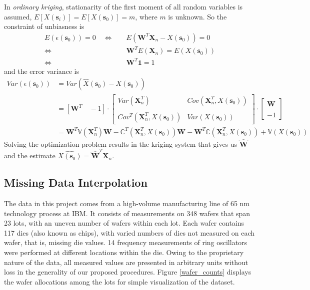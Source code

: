 \documentclass[12pt]{article}
\numberwithin{equation}{section}
\numberwithin{table}{section}
\numberwithin{figure}{section}
\newcommand{\bms}{\bm{s}}
\begin{document}
In \emph{ordinary kriging}, stationarity of the first moment of
all random variables is assumed, $ E[X(\bms_i)] = E[X(\bms_0)] = m$,
where $m$ is unknown. So the constraint of unbiasness is 
\begin{equation} \label{unbias}
\begin{split}
  E(\epsilon(\bms_0)) = 0 \quad 
  \Leftrightarrow \quad &E(\bm{W}^T\bm{X}_n - X(\bms_0)) = 0 \\
  \Leftrightarrow \quad &\bm{W}^TE(\bm{X}_n) = E(X(\bms_0)) \\
  \Leftrightarrow \quad &\bm{W}^T\bm{1} = 1
\end{split}
\end{equation}
and the error variance is
\begin{equation} \label{varerr}
\begin{split}
  Var(\epsilon(\bms_0)) &= Var(\hat{X}(\bms_0) - X(\bms_0)) \\
  &=[\bm{W}^T \quad -1] \cdot 
  \begin{bmatrix}
    Var(\bm{X}_n^T) &  Cov(\bm{X}_n^T,  X(\bms_0))\\
    \\
    Cov^T(\bm{X}_n^T,  X(\bms_0)) & Var(X(\bms_0))
  \end{bmatrix}
  \cdot \begin{bmatrix}
    \bm{W} \\
    \\
    -1
  \end{bmatrix} \\
 &=\bm{W}^T\mathbb{V}(\bm{X}_n^T)\bm{W} - \mathbb{C}^T(\bm{X}_n^T, X(\bms_0))\bm{W}
  - \bm{W}^T\mathbb{C}(\bm{X}_n^T, X(\bms_0)) + \mathbb{V}(X(\bms_0))
\end{split}
\end{equation}
Solving the optimization problem results in the kriging system that
gives us $\hat{\bm{W}}$ and the estimate $\hat{X(\bms_0)}=\hat{\bm{W}}^T\bm{X}_n$.


\subsection{Missing Data Interpolation} \label{nafit}

\hspace{12 pt}
The data in this project comes from a high-volume manufacturing line
of 65 nm technology process at IBM. It consists of measurements on 348
wafers that span 23 lots, with an uneven number of wafers within each
lot. Each wafer contains 117 dies (also known as chips), with varied
numbers of dies not measured on each wafer, that is, missing die
values. 14 frequency measurements of ring oscillators were performed
at different locations within the die. Owing to the proprietary nature
of the data, all measured values are presented in arbitrary units
without loss in the generality of our proposed procedures. 
Figure \ref{wafer_counts} displays the wafer allocations among the
lots for simple visualization of the dataset. 
\end{document}
